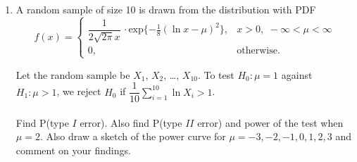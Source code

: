 \documentclass[11pt, a4paper]{article}
\begin{document}
\begin{enumerate}
	\item A random sample of size 10 is drawn from the distribution with PDF
	\begin{equation*}
	 f(x) =
		\begin{cases}
		 \dfrac{1}{2\sqrt{2\pi}x} \, \cdot \text{exp}\{-\frac{1}{8}(\ln x - \mu )^2\}, & x > 0, \,\, -\infty < \mu < \infty  \\
		 0, & \text{otherwise}.
		\end{cases}
	\end{equation*}
	
	Let the random sample be $X_1$, $X_2$, \ldots, $X_{10}$. To test $H_0 : \mu = 1$ against $H_1 : \mu > 1$, we reject $H_0$ if $\dfrac{1}{10} \sum\limits_{i = 1}^{10} \ln X_i > 1$. \\ \\
	Find P(type $I$ error). Also find P(type $II$ error) and power of the test when $\mu = 2$. Also draw a sketch of the power curve for $\mu = -3, -2, -1, 0, 1, 2, 3$ and comment on your findings.
\end{enumerate}
\end{document}
